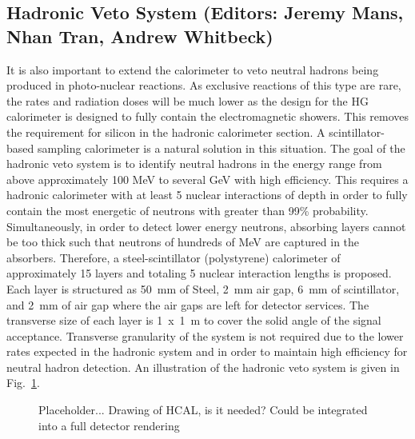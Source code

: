 \subsection{Hadronic Veto System (Editors: Jeremy Mans, Nhan Tran, Andrew Whitbeck)}

It is also important to extend the calorimeter to veto neutral hadrons being produced in photo-nuclear reactions.  
As exclusive reactions of this type are rare, the rates and radiation doses will be much lower as the design for the HG calorimeter is designed to fully contain the electromagnetic showers.  
This removes the requirement for silicon in the hadronic calorimeter section.  
A scintillator-based sampling calorimeter is a natural solution in this situation.  
The goal of the hadronic veto system is to identify neutral hadrons in the energy range from above approximately 100 MeV to several GeV with high efficiency.  
This requires a hadronic calorimeter with at least 5 nuclear interactions of depth in order to fully contain the most energetic of neutrons with greater than 99\% probability.  
Simultaneously, in order to detect lower energy neutrons, absorbing layers cannot be too thick such that neutrons of hundreds of MeV are captured in the absorbers.  
Therefore, a steel-scintillator (polystyrene) calorimeter of approximately 15 layers and totaling 5 nuclear interaction lengths is proposed.  
Each layer is structured as 50~mm of Steel, 2~mm air gap, 6~mm of scintillator, and 2~mm of air gap where the air gaps are left for detector services.  
The transverse size of each layer is 1~x~1~m to cover the solid angle of the signal acceptance.
Transverse granularity of the system is not required due to the lower rates expected in the hadronic system and in order to maintain high efficiency for neutral hadron detection.
An illustration of the hadronic veto system is given in Fig.~\ref{fig:hcal}.

\begin{figure}[hbtp]
\begin{center}
    \caption{Placeholder...
    {\color{blue} Drawing of HCAL, is it needed?  Could be integrated into a full detector rendering}
  }
 \label{fig:hcal}
 \end{center}
\end{figure}

